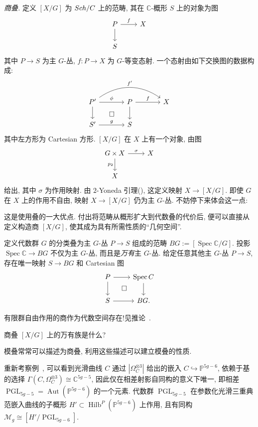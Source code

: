 \textit{商叠.} 定义 $[X/G]$ 为 $Sch/C$ 上的范畴, 其在 $\mathbb C$-概形 $S$ 上的对象为图
\[
\begin{tikzcd}
P\arrow[r,"f"]\arrow[d] & X\\
S &
\end{tikzcd}
\]
其中 $P\to S$ 为主 $G$-丛, $f:P\to X$ 为 $G$-等变态射. 一个态射由如下交换图的数据构成: 
\[
\begin{tikzcd}[column sep=large]
P'\arrow[r,"\phi"]\arrow[rr,bend left=35,"f'"]\arrow[d]\arrow[dr,phantom,"\square"] &
P\arrow[r,"f"]\arrow[d] & X\\
S'\arrow[r,"g"] & S &
\end{tikzcd}
\]
其中左方形为 Cartesian 方形. $[X/G]$ 在 $X$ 上有一个对象, 由图
\[
\begin{tikzcd}
G\times X\arrow[r,"\sigma"]\arrow[d,"p_2"'] & X\\
X &
\end{tikzcd}
\]
给出, 其中 $\sigma$ 为作用映射. 由 $2$-Yoneda 引理(), 这定义映射 $X\to[X/G]$. 即使 $G$ 在 $X$ 上的作用不自由, 映射 $X\to[X/G]$ 仍为主 $G$-丛. 不妨停下来体会这一点: 
\begin{quote}
\end{quote}
这是使用叠的一大优点. 付出将范畴从概形扩大到代数叠的代价后, 便可以直接从定义构造商 $[X/G]$, 使其成为具有所需性质的``几何空间''.
\begin{example}[分类叠]\label{src:1.6.10}
定义代数群 $G$ 的分类叠为主 $G$-丛 $P\to S$ 组成的范畴 $BG:=[\operatorname{Spec}\mathbb C/G]$. 投影 $\operatorname{Spec}\mathbb C\to BG$ 不仅为主 $G$-丛, 而且是\textit{万有}主 $G$-丛. 给定任意其他主 $G$-丛 $P\to S$, 存在唯一映射 $S\to BG$ 和 Cartesian 图
\[
\begin{tikzcd}
P\arrow[r]\arrow[d]\arrow[dr,phantom,"\square"] & \operatorname{Spec}\mathbb C\arrow[d]\\
S\arrow[r] & BG.
\end{tikzcd}
\]
\end{example}
\begin{example}[有限群的商]\label{src:1.6.11}
有限群自由作用的商作为代数空间存在!见推论~.
\end{example}
\begin{exercise}\label{src:1.6.12}
商叠 $[X/G]$ 上的万有族是什么?
\end{exercise}
模叠常常可以描述为商叠, 利用这些描述可以建立模叠的性质.
\begin{example}[光滑曲线的模叠作为商]\label{src:1.6.13}
重新考察例~, 可以看到光滑曲线 $C$ 通过 $|\Omega_C^{\otimes3}|$ 给出的嵌入 $C\hookrightarrow\mathbb P^{5g-6}$, 依赖于基的选择 $\Gamma(C,\Omega_C^{\otimes3})\cong\mathbb C^{5g-5}$, 因此仅在相差射影自同构的意义下唯一, 即相差 $\operatorname{PGL}_{5g-5}=\operatorname{Aut}(\mathbb P^{5g-6})$ 的一个元素. 代数群 $\operatorname{PGL}_{5g-5}$ 在参数化光滑三重典范嵌入曲线的子概形 $H'\subset\operatorname{Hilb}^P(\mathbb P^{5g-6})$ 上作用, 且有同构 $\mathcal M_g\cong[H'/\operatorname{PGL}_{5g-6}]$.
\end{example}
